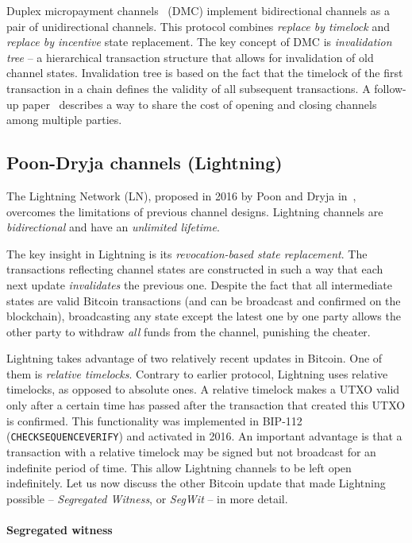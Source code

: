 Duplex micropayment channels~\cite{Decker2015} (DMC) implement bidirectional channels as a pair of unidirectional channels.
This protocol combines \textit{replace by timelock} and \textit{replace by incentive} state replacement.
The key concept of DMC is \textit{invalidation tree} -- a hierarchical transaction structure that allows for invalidation of old channel states.
Invalidation tree is based on the fact that the timelock of the first transaction in a chain defines the validity of all subsequent transactions.
A follow-up paper~\cite{Burchert2017} describes a way to share the cost of opening and closing channels among multiple parties.


\subsection{Poon-Dryja channels (Lightning)}

The Lightning Network (LN), proposed in 2016 by Poon and Dryja in~\cite{Poon2016}, overcomes the limitations of previous channel designs.
Lightning channels are \textit{bidirectional} and have an \textit{unlimited lifetime}.

The key insight in Lightning is its \textit{revocation-based state replacement}.
The transactions reflecting channel states are constructed in such a way that each next update \textit{invalidates} the previous one.
Despite the fact that all intermediate states are valid Bitcoin transactions (and can be broadcast and confirmed on the blockchain), broadcasting any state except the latest one by one party allows the other party to withdraw \textit{all} funds from the channel, punishing the cheater.

Lightning takes advantage of two relatively recent updates in Bitcoin.
One of them is \textit{relative timelocks}.
Contrary to earlier protocol, Lightning uses relative timelocks, as opposed to absolute ones.
A relative timelock makes a UTXO valid only after a certain time has passed after the transaction that created this UTXO is confirmed.
This functionality was implemented in BIP-112~\cite{BtcDrak2015} (\texttt{CHECKSEQUENCEVERIFY}) and activated in 2016.
An important advantage is that a transaction with a relative timelock may be signed but not broadcast for an indefinite period of time.
This allow Lightning channels to be left open indefinitely.
Let us now discuss the other Bitcoin update that made Lightning possible -- \textit{Segregated Witness}, or \textit{SegWit} -- in more detail.


\paragraph{Segregated witness}

